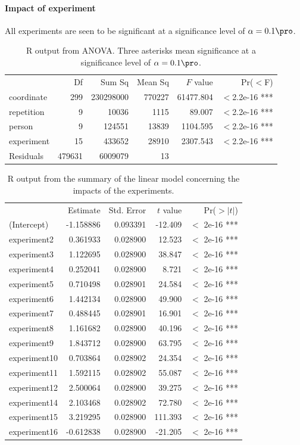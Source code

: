 \documentclass[11pt,fleqn]{article}
\begin{document}
\paragraph{Impact of experiment}
All experiments are seen to be significant at a significance level of $ \alpha=0.1\pro $.
\begin{table}[H]
	\centering
	\begin{tabular}{lrrrrr}
		          &     Df&    Sum Sq& Mean Sq&   $ F $ value&    Pr($ < $F)    \\
		coordinate&    299& 230298000&  770227& 61477.804&  $ < $2.2e-16 ***\\
		repetition&      9&     10036&    1115&    89.007&  $ < $2.2e-16 ***\\
		person    &      9&    124551&   13839&  1104.595&  $ < $2.2e-16 ***\\
		experiment&     15&    433652&   28910&  2307.543&  $ < $2.2e-16 ***\\
		Residuals & 479631&   6009079&      13& &
	\end{tabular}
	\caption{R output from ANOVA. Three asterisks mean significance at a significance level of $ \alpha=0.1\pro $.}\label{tab:ranova}
\end{table}
\begin{table}[H]
	\centering
	\begin{tabular}{lrrrr}
		&Estimate &Std. Error &$ t $ value &Pr($ >|t| $)\\
		(Intercept)&    -1.158886&   0.093391& -12.409&  $ < $ 2e-16 ***\\
		experiment2&     0.361933&   0.028900&  12.523&  $ < $ 2e-16 ***\\
		experiment3&     1.122695&   0.028900&  38.847&  $ < $ 2e-16 ***\\
		experiment4&     0.252041&   0.028900&   8.721&  $ < $ 2e-16 ***\\
		experiment5&     0.710498&   0.028901&  24.584&  $ < $ 2e-16 ***\\
		experiment6&     1.442134&   0.028900&  49.900&  $ < $ 2e-16 ***\\
		experiment7&     0.488445&   0.028901&  16.901&  $ < $ 2e-16 ***\\
		experiment8&     1.161682&   0.028900&  40.196&  $ < $ 2e-16 ***\\
		experiment9&     1.843712&   0.028900&  63.795&  $ < $ 2e-16 ***\\
		experiment10&    0.703864&   0.028902&  24.354&  $ < $ 2e-16 ***\\
		experiment11&    1.592115&   0.028902&  55.087&  $ < $ 2e-16 ***\\
		experiment12&    2.500064&   0.028900&  39.275&  $ < $ 2e-16 ***\\
		experiment14&    2.103468&   0.028902&  72.780&  $ < $ 2e-16 ***\\
		experiment15&    3.219295&   0.028900& 111.393&  $ < $ 2e-16 ***\\
		experiment16&   -0.612838&   0.028900& -21.205&  $ < $ 2e-16 ***
	\end{tabular}
	\caption{R output from the summary of the linear model concerning the impacts of the experiments.}
\end{table}\noindent
\end{document}
